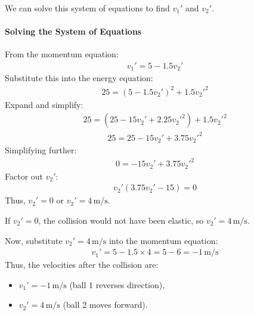 \documentclass[letterpaper,10pt,english]{jupyterBook}
\begin{document}
\sphinxAtStartPar
We can solve this system of equations to find \(v_1'\) and \(v_2'\).


\paragraph{Solving the System of Equations}
\label{\detokenize{prerequisites:solving-the-system-of-equations}}
\sphinxAtStartPar
From the momentum equation:
\begin{equation*}
\begin{split}
v_1' = 5 - 1.5 v_2'
\end{split}
\end{equation*}
\sphinxAtStartPar
Substitute this into the energy equation:
\begin{equation*}
\begin{split}
25 = (5 - 1.5 v_2')^2 + 1.5 v_2'^2
\end{split}
\end{equation*}
\sphinxAtStartPar
Expand and simplify:
\begin{equation*}
\begin{split}
25 = (25 - 15 v_2' + 2.25 v_2'^2) + 1.5 v_2'^2
\end{split}
\end{equation*}\begin{equation*}
\begin{split}
25 = 25 - 15 v_2' + 3.75 v_2'^2
\end{split}
\end{equation*}
\sphinxAtStartPar
Simplifying further:
\begin{equation*}
\begin{split}
0 = -15 v_2' + 3.75 v_2'^2
\end{split}
\end{equation*}
\sphinxAtStartPar
Factor out \(v_2'\):
\begin{equation*}
\begin{split}
v_2' (3.75 v_2' - 15) = 0
\end{split}
\end{equation*}
\sphinxAtStartPar
Thus, \(v_2' = 0\) or \(v_2' = 4 \, \text{m/s}\).

\sphinxAtStartPar
If \(v_2' = 0\), the collision would not have been elastic, so \(v_2' = 4 \, \text{m/s}\).

\sphinxAtStartPar
Now, substitute \(v_2' = 4 \, \text{m/s}\) into the momentum equation:
\begin{equation*}
\begin{split}
v_1' = 5 - 1.5 \times 4 = 5 - 6 = -1 \, \text{m/s}
\end{split}
\end{equation*}
\sphinxAtStartPar
Thus, the velocities after the collision are:
\begin{itemize}
\item {} 
\sphinxAtStartPar
\(v_1' = -1 \, \text{m/s}\) (ball 1 reverses direction),

\item {} 
\sphinxAtStartPar
\(v_2' = 4 \, \text{m/s}\) (ball 2 moves forward).

\end{itemize}
\end{document}
